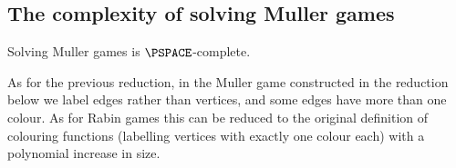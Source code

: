 \subsection*{The complexity of solving Muller games}    

\begin{theorem}
\label{2-thm:complexity_Muller}
Solving Muller games is $\PSPACE$-complete.
\end{theorem}

As for the previous reduction, in the Muller game constructed in the reduction below we label edges rather than vertices,
and some edges have more than one colour.
As for Rabin games this can be reduced to the original definition of colouring functions (labelling vertices with exactly one colour each) with a polynomial increase in size.

